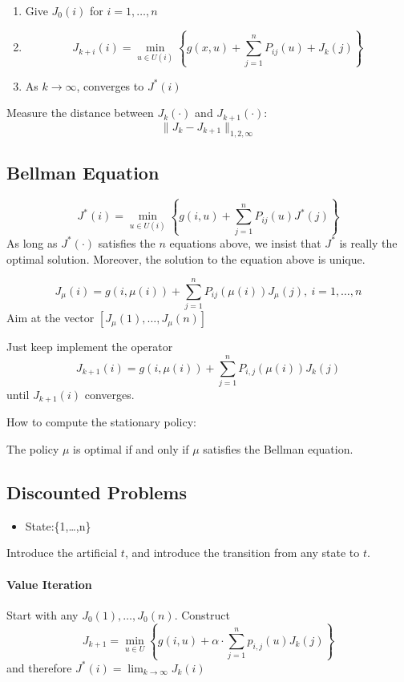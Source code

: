 \begin{enumerate}
\item
Give $J_0(i)$ for $i=1,\dots,n$
\item
\[
J_{k+i}(i) = \min_{u\in U(i)}\left\{
g(x,u)+\sum_{j=1}^nP_{ij}(u)+J_k(j)
\right\}
\]
\item
As $k\to\infty$, converges to $J^*(i)$
\end{enumerate}

Measure the distance between $J_k(\cdot)$ and $J_{k+1}(\cdot)$:
\[
\|J_k - J_{k+1}\|_{1,2,\infty}
\]

\subsection{Bellman Equation}
\[
J^*(i) = \min_{u\in U(i)}
\left\{
g(i,u)
+
\sum_{j=1}^nP_{ij}(u)J^*(j)
\right\}
\]
As long as $J^*(\cdot)$ satisfies the $n$ equations above, we insist that $J^*$ is really the optimal solution.
Moreover, the solution to the equation above is unique.

\[
J_{\mu}(i) = g(i,\mu(i)) + \sum_{j=1}^nP_{ij}(\mu(i))J_{\mu}(j), \ i=1,\dots,n
\]
Aim at the vector $[J_{\mu}(1),\dots,J_{\mu}(n)]$

Just keep implement the operator
\[
J_{k+1}(i) = g(i,\mu(i))+\sum_{j=1}^nP_{i,j}(\mu(i))J_k(j)
\]
until $J_{k+1}(i)$ converges.

How to compute the stationary policy:
\begin{proposition}
The policy $\mu$ is optimal if and only if $\mu$ satisfies the Bellman equation.
\end{proposition}



\subsection{Discounted Problems}
\begin{itemize}
\item
State:\{1,\dots,n\}
\end{itemize}
Introduce the artificial $t$, and introduce the transition from any state to $t$.


\paragraph{Value Iteration}
Start with any $J_0(1),\dots,J_0(n)$.
Construct
\[
J_{k+1} = \min_{u\in U}\left\{
g(i,u)+\alpha\cdot\sum_{j=1}^np_{i,j}(u)J_k(j)
\right\}
\]
and therefore $J^*(i) = \lim_{k\to\infty}J_k(i)$

